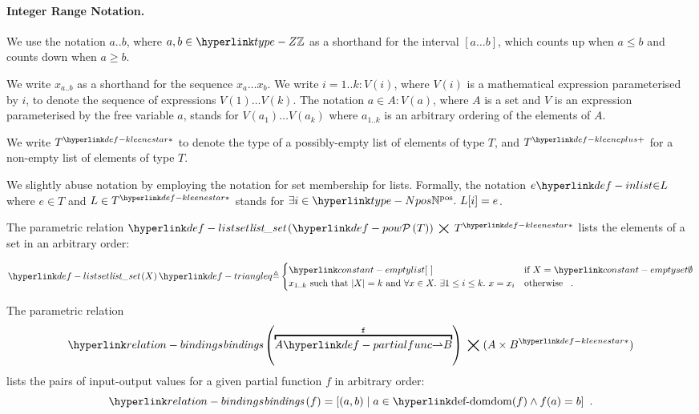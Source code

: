 \paragraph{Integer Range Notation.}
We use the notation $a..b$, where $a,b\in\Z$ as a shorthand for the interval $[a\ldots b]$,
which counts up when $a \leq b$ and counts down when $a \geq b$.

We write $x_{a..b}$ as a shorthand for the sequence $x_a \ldots x_b$.
%
We write $i=1..k: V(i)$, where $V(i)$ is a mathematical expression parameterised by $i$,
to denote the sequence of expressions $V(1) \ldots V(k)$.
The notation $a \in A: V(a)$, where $A$ is a set and $V$ is an expression parameterised by the free variable $a$,
stands for $V(a_1) \ldots V(a_k)$ where $a_{1..k}$ is an arbitrary ordering of the elements of $A$.

\hypertarget{def-kleenestar}{}
\hypertarget{def-kleeneplus}{}
We write $\KleeneStar{T}$ to denote the type of a possibly-empty list of elements of type $T$,
and $\KleenePlus{T}$ for a non-empty list of elements of type $T$.

\hypertarget{def-inlist}{}
We slightly abuse notation by employing the notation for set membership for lists.
Formally, the notation $e \inlist L$ where $e \in T$ and $L \in \KleeneStar{T}$ stands for $\exists i\in\Npos.\ L[i]=e$.

\hypertarget{def-listset}{}
\begin{definition}
The parametric relation $\listset{\pow{T}} \;\aslrel\; \KleeneStar{T}$
lists the elements of a set in an arbitrary order:

\[
\listset{X} \triangleq \begin{cases}
  \emptylist & \text{if }X = \emptyset\\
  x_{1..k}\text{ such that }|X| = k\text{ and }\forall x\in X.\ \exists 1 \leq i \leq k.\ x = x_i & \text{otherwise } \enspace.
\end{cases}
\]
\end{definition}

\hypertarget{relation-bindings}{}
\begin{definition}
The parametric relation
\[
\bindings{\overtext{A \partialto B}{\vf}} \;\aslrel\; (\KleeneStar{A \times B})
\]
lists the pairs of input-output values for a given partial function $f$ in arbitrary order:
\[
\bindings{f} = [ (a,b) \;|\; a \in \dom(f) \wedge f(a) = b] \enspace.
\]
\end{definition}

